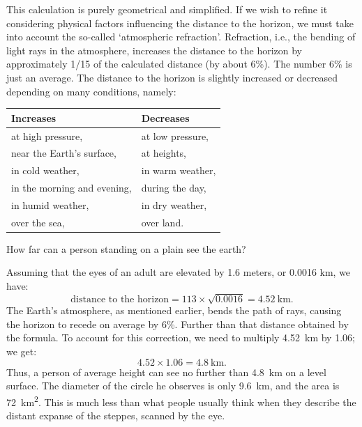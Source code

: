 This calculation is purely geometrical and simplified. If we wish to refine it considering physical factors influencing the distance to the horizon, we must take into account the so-called `atmospheric refraction'. Refraction, i.e., the bending of light rays in the atmosphere, increases the distance to the horizon by approximately 1/15 of the calculated distance (by about 6\%). The number 6\% is just an average. The distance to the horizon is slightly increased or decreased depending on many conditions, namely:

\begin{footnotesize}
\begin{center}
\begin{tabular}{p{3cm}p{3cm}}
\toprule
\textbf{Increases} & \textbf{Decreases} \\
\midrule
 at high pressure, &  at low pressure,\\
 near the Earth's surface, & at heights,\\
 in cold weather, & in warm weather,\\
 in the morning and evening, & during the day,\\
 in humid weather, & in dry weather,\\
 over the sea, & over land.\\
\bottomrule
\end{tabular}
\end{center}
\end{footnotesize}



\ques How far can a person standing on a plain see the earth? 

\ans Assuming that the eyes of an adult are elevated by 1.6 meters, or 0.0016 km, we have:
\begin{equation*}%
\text{distance to the horizon} = 113 \times \sqrt{0.0016} = \SI{4.52}{\kilo\meter}.
\end{equation*}
The Earth's atmosphere, as mentioned earlier, bends the path of rays, causing the horizon to recede on average by 6\%. Further than that distance obtained by the formula. To account for this correction, we need to multiply \SI{4.52}{\kilo\meter} by 1.06; we get: 
\begin{equation*}%
4.52 \times 1.06 = \SI{4.8}{\kilo\meter}.
\end{equation*}
Thus, a person of average height can see no further than \SI{4.8}{\kilo\meter} on a level surface. The diameter of the circle he observes is only \SI{9.6}{\kilo\meter}, and the area is \SI{72}{\kilo\meter\squared}. This is much less than what people usually think when they describe the distant expanse of the steppes, scanned by the eye.



